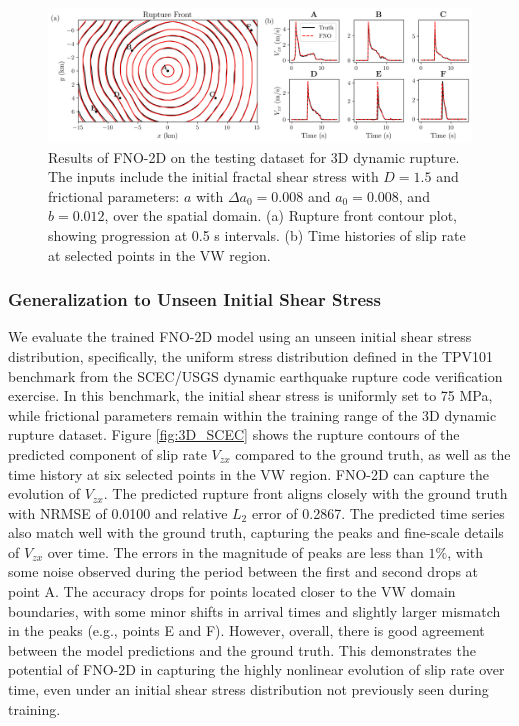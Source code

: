 \documentclass[draft]{agujournal2019}
\begin{document}
\begin{figure}
\centering
\includegraphics[width=1.0\linewidth]{3D_rupture_front_test2.png}
\caption{\label{fig:3D_test}Results of FNO-2D on the testing dataset for 3D dynamic rupture. The inputs include the initial fractal shear stress with \( D = 1.5 \) and frictional parameters: \( a \) with \( \Delta a_0 = 0.008 \) and \( a_0 = 0.008 \), and \( b = 0.012 \), over the spatial domain. (a) Rupture front contour plot, showing progression at 0.5 s intervals. (b) Time histories of slip rate at selected points in the VW region.
}
\end{figure}

\subsubsection{Generalization to Unseen Initial Shear Stress}
\label{sec:FNO-2D_unseen_shear}

We evaluate the trained FNO-2D model using an unseen initial shear stress distribution, specifically, the uniform stress distribution defined in the TPV101 benchmark from the SCEC/USGS dynamic earthquake rupture code verification exercise. In this benchmark, the initial shear stress is uniformly set to 75 MPa, while frictional parameters remain within the training range of the 3D dynamic rupture dataset. Figure \ref{fig:3D_SCEC} shows the rupture contours of the predicted component of slip rate \(V_{zx}\) compared to the ground truth, as well as the time history at six selected points in the VW region. FNO-2D can capture the evolution of \(V_{zx}\). The predicted rupture front aligns closely with the ground truth with NRMSE of 0.0100 and relative \(L_2\) error of 0.2867. The predicted time series also match well with the ground truth, capturing the peaks and fine-scale details of \(V_{zx}\) over time. The errors in the magnitude of peaks are less than \(1\%\), with some noise observed during the period between the first and second drops at point A. The accuracy drops for points located closer to the VW domain boundaries, with some minor shifts in arrival times and slightly larger mismatch in the peaks (e.g., points E and F). However, overall, there is good agreement between the model predictions and the ground truth. This demonstrates the potential of FNO-2D in capturing the highly nonlinear evolution of slip rate over time, even under an initial shear stress distribution not previously seen during training.
\end{document}
